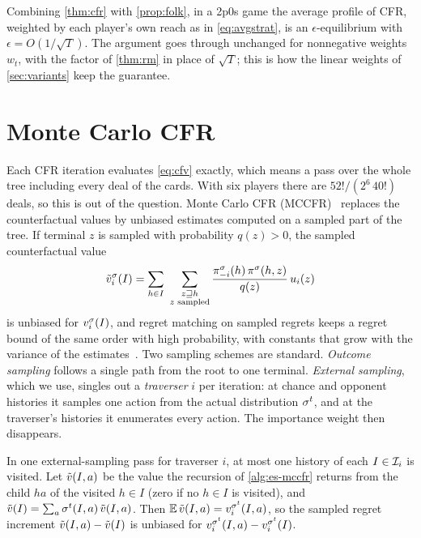 Combining \cref{thm:cfr} with \cref{prop:folk}, in a 2p0s game the average profile of CFR, weighted by each player's
own reach as in \eqref{eq:avgstrat}, is an $\epsilon$-equilibrium with $\epsilon = O(1/\sqrt T)$. The argument goes
through unchanged for nonnegative weights $w_t$, with the factor of \cref{thm:rm} in place of $\sqrt T$; this is how
the linear weights of \cref{sec:variants} keep the guarantee.

\section{Monte Carlo CFR}\label{sec:mccfr}

Each CFR iteration evaluates \eqref{eq:cfv} exactly, which means a pass over the whole tree including every deal of
the cards. With six players there are $52!/(2^6\,40!)$ deals, so this is out of the question. Monte Carlo CFR
(MCCFR)~\cite{lanctot2009} replaces the counterfactual values by unbiased estimates computed on a sampled part of the
tree. If terminal $z$ is sampled with probability $q(z) > 0$, the sampled counterfactual value
\[
  \tilde\cfv_i^\strat(I) = \sum_{h \in I}\ \sum_{\substack{z \sqsupseteq h\\ z \text{ sampled}}}
  \frac{\reach^\strat_{-i}(h)\,\reach^\strat(h,z)}{q(z)}\, u_i(z)
\]
is unbiased for $v_i^\sigma(I)$, and regret matching on sampled regrets keeps a regret bound of the same order with
high probability, with constants that grow with the variance of the estimates~\cite{lanctot2009}. Two sampling schemes
are standard. \emph{Outcome sampling} follows a single path from the root to one terminal. \emph{External sampling},
which we use, singles out a \emph{traverser} $i$ per iteration: at chance and opponent histories it samples one action
from the actual distribution $\sigma^t$, and at the traverser's histories it enumerates every action. The importance
weight then disappears.

\begin{proposition}\label{prop:es-unbiased}
In one external-sampling pass for traverser $i$, at most one history of each $I \in \mathcal{I}_i$ is visited. Let
$\tilde{v}(I,a)$ be the value the recursion of \cref{alg:es-mccfr} returns from the child $ha$ of the visited $h \in
I$ (zero if no $h \in I$ is visited), and $\tilde{v}(I) = \sum_a \sigma^t(I,a)\,\tilde{v}(I,a)$. Then
$\mathbb{E}\,\tilde{v}(I,a) = v_i^{\sigma^t}(I,a)$, so the sampled regret increment $\tilde{v}(I,a) - \tilde{v}(I)$ is
unbiased for $v_i^{\sigma^t}(I,a) - v_i^{\sigma^t}(I)$.
\end{proposition}

